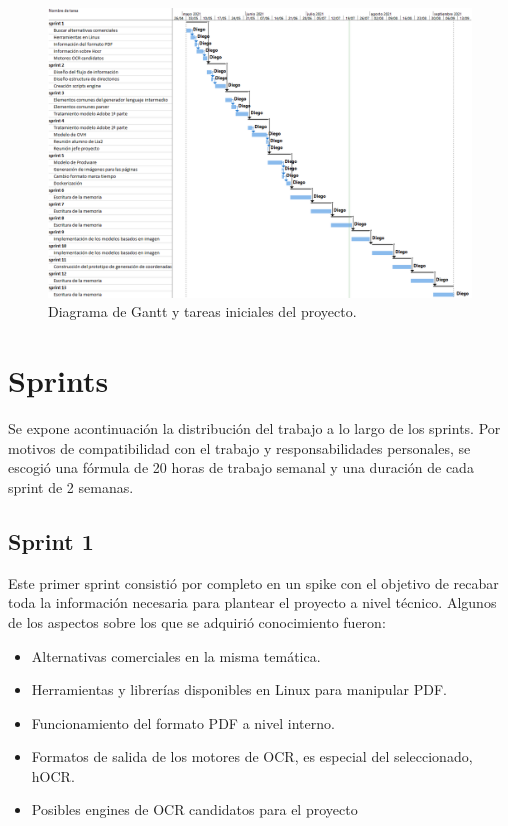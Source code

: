 \begin{figure}[hp!]
    \centering
    \includegraphics[angle=90,width=1.0\textwidth]{imaxes/f-planificacion/gantt-inicial.png}
    \caption{Diagrama de Gantt y tareas iniciales del proyecto.}
    \label{fig:gantt-inicial}
\end{figure}

\section{Sprints}

Se expone acontinuación la distribución del trabajo a lo largo de los sprints. Por motivos de compatibilidad con el trabajo y responsabilidades personales, se escogió una fórmula de 20 horas de trabajo semanal y una duración de cada sprint de 2 semanas.

\subsection{Sprint 1}

Este primer sprint consistió por completo en un spike con el objetivo de recabar toda la información necesaria para plantear el proyecto a nivel técnico. Algunos de los aspectos sobre los que se adquirió conocimiento fueron:

\begin{itemize}
    \item Alternativas comerciales en la misma temática.
    \item Herramientas y librerías disponibles en Linux para manipular PDF.
    \item Funcionamiento del formato PDF a nivel interno.
    \item Formatos de salida de los motores de OCR, es especial del seleccionado, hOCR.
    \item Posibles engines de OCR candidatos para el proyecto
\end{itemize}

